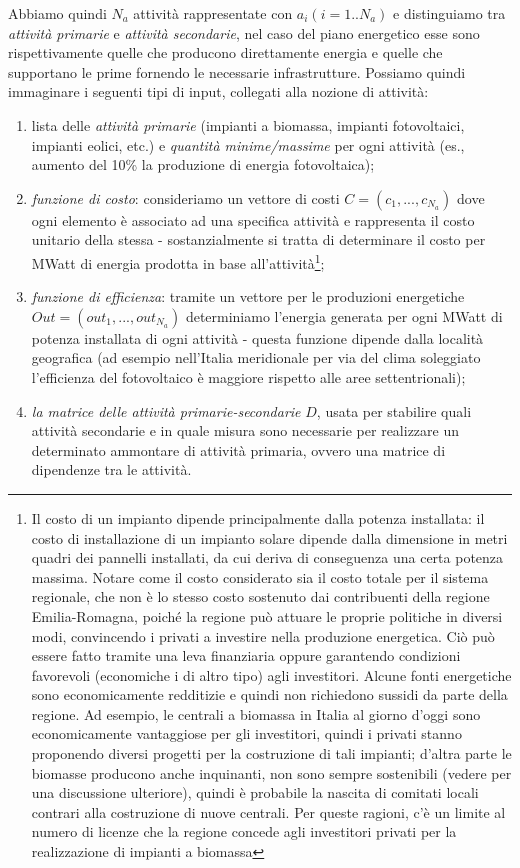 \documentclass[12pt,a4paper,openright,twoside]{report}
\begin{document}
Abbiamo quindi $N_a$ attività rappresentate con $a_i (i=1..N_a)$ e distinguiamo tra \emph{attività primarie} e \emph{attività secondarie}, nel caso del piano energetico esse sono rispettivamente quelle che producono direttamente energia e quelle che supportano le prime fornendo le necessarie infrastrutture. Possiamo quindi immaginare i seguenti tipi di input, collegati alla nozione di attività:
\begin{enumerate}
\item lista delle \emph{attività primarie} (impianti a biomassa, impianti fotovoltaici, impianti eolici, etc.) e \emph{quantità minime/massime} per ogni attività (es., aumento del 10\% la produzione di energia fotovoltaica);
\item \emph{funzione di costo}: consideriamo un vettore di costi $C=(c_1,...,c_{N_a})$ dove ogni elemento è associato ad una specifica attività e rappresenta il costo unitario della stessa - sostanzialmente si tratta di determinare il costo per MWatt di energia prodotta in base all'attività\footnote{Il costo di un impianto dipende principalmente dalla potenza installata: il costo di installazione di un impianto solare dipende dalla dimensione in metri quadri dei pannelli installati, da cui deriva di conseguenza una certa potenza massima. Notare come il costo considerato sia il costo totale per il sistema regionale, che non è lo stesso costo sostenuto dai contribuenti della regione Emilia-Romagna, poiché la regione può attuare le proprie politiche in diversi modi, convincendo i privati a investire nella produzione energetica. Ciò può essere fatto tramite una leva finanziaria oppure garantendo condizioni favorevoli (economiche i di altro tipo) agli investitori. Alcune fonti energetiche sono economicamente redditizie e quindi non richiedono sussidi da parte della regione. Ad esempio, le centrali a biomassa in Italia al giorno d'oggi sono economicamente vantaggiose per gli investitori, quindi i privati stanno proponendo diversi progetti per la costruzione di tali impianti; d'altra parte le biomasse producono anche inquinanti, non sono sempre sostenibili (vedere \cite{Cattafi} per una discussione ulteriore), quindi è probabile la nascita di comitati locali contrari alla costruzione di nuove centrali. Per queste ragioni, c'è un limite al numero di licenze che la regione concede agli investitori privati per la realizzazione di impianti a biomassa};
\item \emph{funzione di efficienza}: tramite un vettore per le produzioni energetiche $Out=(out_1,...,out_{N_a})$ determiniamo l'energia generata per ogni MWatt di potenza installata di ogni attività - questa funzione dipende dalla località geografica (ad esempio nell'Italia meridionale per via del clima soleggiato l'efficienza del fotovoltaico è maggiore rispetto alle aree settentrionali); 
\item \emph{la matrice delle attività primarie-secondarie} $D$, usata per stabilire quali attività secondarie e in quale misura sono necessarie per realizzare un determinato ammontare di attività primaria, ovvero una matrice di dipendenze tra le attività. 
\end{enumerate}
\end{document}
